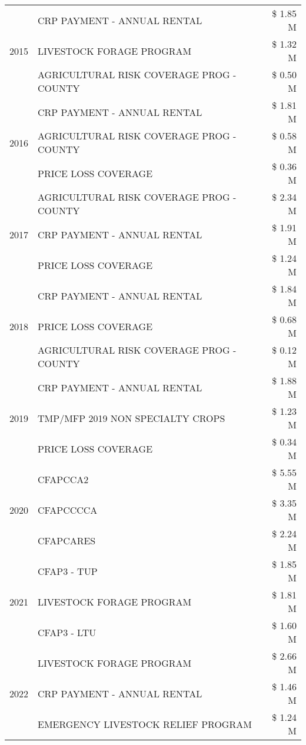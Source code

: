 \begin{tabular}{llr}
\cline{1-3}
\multirow[t]{3}{*}{2015} & CRP PAYMENT - ANNUAL RENTAL & \$ 1.85 M \\
 & LIVESTOCK FORAGE PROGRAM & \$ 1.32 M \\
 & AGRICULTURAL RISK COVERAGE PROG - COUNTY & \$ 0.50 M \\
\cline{1-3}
\multirow[t]{3}{*}{2016} & CRP PAYMENT - ANNUAL RENTAL & \$ 1.81 M \\
 & AGRICULTURAL RISK COVERAGE PROG - COUNTY & \$ 0.58 M \\
 & PRICE LOSS COVERAGE & \$ 0.36 M \\
\cline{1-3}
\multirow[t]{3}{*}{2017} & AGRICULTURAL RISK COVERAGE PROG - COUNTY & \$ 2.34 M \\
 & CRP PAYMENT - ANNUAL RENTAL & \$ 1.91 M \\
 & PRICE LOSS COVERAGE & \$ 1.24 M \\
\cline{1-3}
\multirow[t]{3}{*}{2018} & CRP PAYMENT - ANNUAL RENTAL & \$ 1.84 M \\
 & PRICE LOSS COVERAGE & \$ 0.68 M \\
 & AGRICULTURAL RISK COVERAGE PROG - COUNTY & \$ 0.12 M \\
\cline{1-3}
\multirow[t]{3}{*}{2019} & CRP PAYMENT - ANNUAL RENTAL & \$ 1.88 M \\
 & TMP/MFP 2019 NON SPECIALTY CROPS & \$ 1.23 M \\
 & PRICE LOSS COVERAGE & \$ 0.34 M \\
\cline{1-3}
\multirow[t]{3}{*}{2020} & CFAPCCA2 & \$ 5.55 M \\
 & CFAPCCCCA & \$ 3.35 M \\
 & CFAPCARES & \$ 2.24 M \\
\cline{1-3}
\multirow[t]{3}{*}{2021} & CFAP3 - TUP & \$ 1.85 M \\
 & LIVESTOCK FORAGE PROGRAM & \$ 1.81 M \\
 & CFAP3 - LTU & \$ 1.60 M \\
\cline{1-3}
\multirow[t]{3}{*}{2022} & LIVESTOCK FORAGE PROGRAM & \$ 2.66 M \\
 & CRP PAYMENT - ANNUAL RENTAL & \$ 1.46 M \\
 & EMERGENCY LIVESTOCK RELIEF PROGRAM & \$ 1.24 M \\
\cline{1-3}
\bottomrule
\end{tabular}
